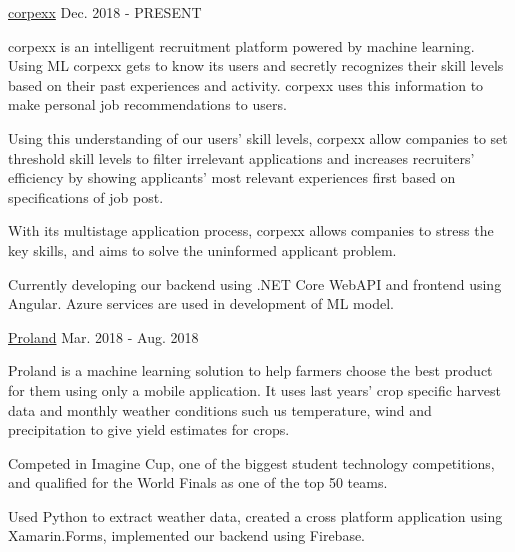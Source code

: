 
\vspace*{-1.5mm}
\begin{cventries}

  \project
    {\href{http://corpexx.com}{corpexx}} %
    {Dec. 2018 - PRESENT} %
    {
      \begin{cvitems}
        \item {corpexx is an intelligent recruitment platform powered by machine learning. Using ML corpexx gets to know its users and secretly recognizes their skill levels based on their past experiences and activity. corpexx uses this information to make personal job recommendations to users.}
        \item {Using this understanding of our users’ skill levels, corpexx allow companies to set threshold skill levels to filter irrelevant applications and increases recruiters’ efficiency by showing applicants’ most relevant experiences first based on specifications of job post.}
        \item {With its multistage application process, corpexx allows companies to stress the key skills, and aims to solve the uninformed applicant problem.}
        \item {Currently developing our backend using .NET Core WebAPI and frontend using Angular. Azure services are used in development of ML model.}
      \end{cvitems}
    }

  \project
    {\href{http://prolandfarming.com}{Proland}} %
    {Mar. 2018 - Aug. 2018} %
    {
      \begin{cvitems}
        \item {Proland is a machine learning solution to help farmers choose the best product for them using only a mobile application. It uses last years' crop specific harvest data and monthly weather conditions such us temperature, wind and precipitation to give yield estimates for crops.}
        \item {Competed in Imagine Cup, one of the biggest student technology competitions, and qualified for the World Finals as one of the top 50 teams.}
        \item {Used Python to extract weather data, created a cross platform application using Xamarin.Forms, implemented our backend using Firebase.}
      \end{cvitems}
    }
\end{cventries}
